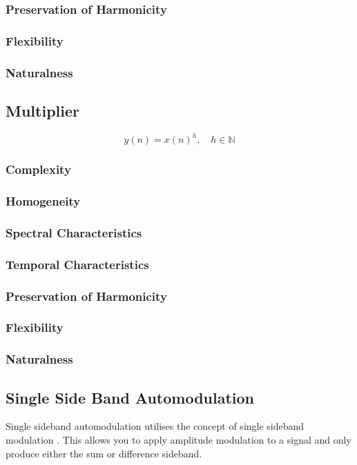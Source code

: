 		\subsubsection*{Preservation of Harmonicity}
		\subsubsection*{Flexibility}
		\subsubsection*{Naturalness}

	\subsection{Multiplier}
	\label{sec:Excitation-Multiplier}
		\begin{equation}
			y(n) = x(n)^{h}, \quad h \in \mathbb{N}
			\label{eq:Multiplier}
		\end{equation}

		\subsubsection*{Complexity}
		\subsubsection*{Homogeneity}
		\subsubsection*{Spectral Characteristics}
		\subsubsection*{Temporal Characteristics}
		\subsubsection*{Preservation of Harmonicity}
		\subsubsection*{Flexibility}
		\subsubsection*{Naturalness}

	\subsection{Single Side Band Automodulation}
	\label{sec:Excitation-SSB}
		Single sideband automodulation utilises the concept of single sideband modulation
		\citep{corinthios2009signals}. This allows you to apply amplitude modulation to a signal and only produce
		either the sum or difference sideband.

